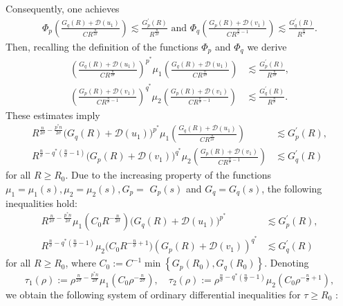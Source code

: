 \documentclass[11pt,reqno]{amsart}
\newcommand{\tron}[1]{\left( #1 \right)}
\numberwithin{equation}{section}
\begin{document}
Consequently, one achieves
\begin{align*}
    \Phi_p\left(\frac{G_q(R)+\mathcal{D}(u_1)}{CR^{\frac{n}{2\sigma}}}\right) \lesssim \frac{G_p^{\prime}(R)}{R^{\frac{n}{2\sigma}}}\text{ and }\Phi_q\left(\frac{G_p(R)+\mathcal{D}(v_1)}{CR^{\frac{n}{\sigma}-1}}\right) \lesssim \frac{G_q^{\prime}(R)}{R^{\frac{n}{\sigma}}}.
\end{align*}
Then, recalling the definition of the functions $\Phi_p$ and $\Phi_q$ we derive
\begin{align*}
    \left(\frac{G_q(R)+\mathcal{D}(u_1)}{CR^{\frac{n}{2\sigma}}}\right)^{p^*} \mu_1\left(\frac{G_q(R)+\mathcal{D}(u_1)}{CR^{\frac{n}{2\sigma}}}\right) &\lesssim \frac{G_p^{\prime}(R)}{R^{\frac{n}{2\sigma}}},  \\
    \left(\frac{G_p(R)+\mathcal{D}(v_1)}{CR^{\frac{n}{\sigma}-1}}\right)^{q^*} \mu_2\left(\frac{G_p(R)+\mathcal{D}(v_1)}{CR^{\frac{n}{\sigma}-1}}\right) &\lesssim \frac{G_q^{\prime}(R)}{R^{\frac{n}{\sigma}}}.
\end{align*}
These estimates imply
\begin{align*}
    R^{\frac{n}{2\sigma}-\frac{p^*n}{2\sigma}}\big(G_q(R)+\mathcal{D}(u_1)\big)^{p^*}\mu_1\left(\frac{G_q(R)+\mathcal{D}(u_1)}{CR^{\frac{n}{2\sigma}}}\right) &\lesssim G_p^{\prime}(R),   \\
    R^{\frac{n}{\sigma}-q^*\tron{\frac{n}{\sigma}-1}}\big(G_p(R)+\mathcal{D}(v_1)\big)^{q^*}\mu_2\left(\frac{G_p(R)+\mathcal{D}(v_1)}{CR^{\frac{n}{\sigma}-1}}\right) &\lesssim G_q^{\prime}(R)
\end{align*}
for all $R \geq R_0$. Due to the increasing property of the functions $\mu_1=\mu_1(s), \mu_2=\mu_2(s), G_p=$ $G_p(s)$ and $G_q=G_q(s)$, the following inequalities hold:
\begin{align*}
    R^{\frac{n}{2\sigma}-\frac{p^*n}{2\sigma}}\mu_1\left(C_0 R^{-\frac{n}{2\sigma}}\right)\big(G_q(R)+\mathcal{D}(u_1)\big)^{p^*} &\lesssim G_p^{\prime}(R), \\
    R^{\frac{n}{\sigma}-q^*\tron{\frac{n}{\sigma}-1}}\mu_2\big(C_0 R^{-\frac{n}{\sigma}+1}\big)\left(G_p(R)+\mathcal{D}(v_1)\right)^{q^*} &\lesssim G_q^{\prime}(R)
\end{align*}
for all $R\geq R_0$, where $C_0:=C^{-1}\min \left\{G_p\left(R_0\right), G_q\left(R_0\right)\right\}$. Denoting
$$
\tau_1(\rho):=\rho^{\frac{n}{2\sigma}-\frac{p^*n}{2\sigma}}\mu_1\left(C_0 \rho^{-\frac{n}{2\sigma}}\right), \quad \tau_2(\rho):=\rho^{\frac{n}{\sigma}-q^*\tron{\frac{n}{\sigma}-1}}\mu_2\left(C_0 \rho^{-\frac{n}{\sigma}+1}\right),
$$
we obtain the following system of ordinary differential inequalities for $\tau \geq R_0$ :
\end{document}
